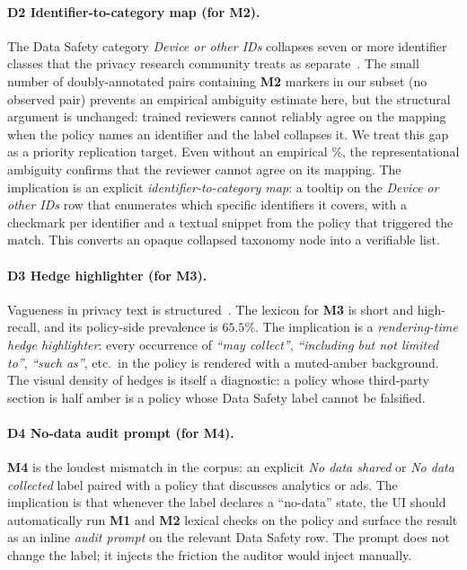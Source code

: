 \documentclass[11pt,a4paper]{article}
\newcommand{\code}[1]{\textsf{\textbf{#1}}}
\begin{document}
\paragraph{\textbf{D2} Identifier-to-category map (for \code{M2}).}
The Data Safety category \textsl{Device or other IDs} collapses
seven or more identifier classes that the privacy research community
treats as separate~\citep{razaghpanah2018apps,reardon2019fifty}. The
small number of doubly-annotated pairs containing \code{M2} markers
in our subset (no observed pair) prevents an empirical ambiguity
estimate here, but the structural argument is unchanged: trained
reviewers cannot reliably agree on the mapping when the policy names
an identifier and the label collapses it. We treat this gap as a
priority replication target. Even without an empirical $\%$, the
representational ambiguity confirms that the reviewer cannot agree
on its
mapping. The implication is an explicit \emph{identifier-to-category
map}: a tooltip on the \textsl{Device or other IDs} row that
enumerates which specific identifiers it covers, with a checkmark per
identifier and a textual snippet from the policy that triggered the
match. This converts an opaque collapsed taxonomy node into a
verifiable list.

\paragraph{\textbf{D3} Hedge highlighter (for \code{M3}).}
Vagueness in privacy text is structured~\citep{bhatia2016theory}.
The lexicon for \code{M3} is short and high-recall, and its
policy-side prevalence is $65.5\%$. The implication is a
\emph{rendering-time hedge highlighter}: every occurrence of
\textit{``may collect''}, \textit{``including but not limited to''},
\textit{``such as''}, etc.\ in the policy is rendered with a
muted-amber background. The visual density of hedges is itself a
diagnostic: a policy whose third-party section is half amber is a
policy whose Data Safety label cannot be falsified.

\paragraph{\textbf{D4} No-data audit prompt (for \code{M4}).}
\code{M4} is the loudest mismatch in the corpus: an explicit
\textsl{No data shared} or \textsl{No data collected} label paired
with a policy that discusses analytics or ads. The implication is
that whenever the label declares a ``no-data'' state, the UI should
automatically run \code{M1} and \code{M2} lexical checks on the
policy and surface the result as an inline \emph{audit prompt} on
the relevant Data Safety row. The prompt does not change the label;
it injects the friction the auditor would inject manually.
\end{document}
